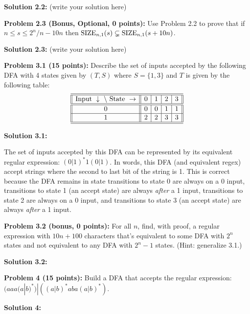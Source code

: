 \documentclass[11pt]{article}
\begin{document}
\textbf{Solution 2.2:} (write your solution here)

\textbf{Problem 2.3 (Bonus, Optional, 0 points):}
Use Problem 2.2 to prove that if $n \leq s \leq 2^n/n - 10n$ then $\mathrm{SIZE}_{n,1}(s) \subsetneq \mathrm{SIZE}_{n,1}(s+10n)$. 

\textbf{Solution 2.3:} (write your solution here)
\fi


\newpage 

\textbf{Problem 3.1 (15 points):} Describe the set of inputs accepted by the following DFA with 4 states given by $(T,S)$ where $S = \{1,3\}$ and $T$ is given by the following table:
\[
\begin{array}{||c||c|c|c|c||}
\hline
\hline
\mathrm{Input}~\downarrow ~\backslash~ \mathrm{State}~\to & 0 & 1 & 2 & 3 \\
\hline
\hline
0 & 0 & 0 & 1 & 1 \\
\hline
1 & 2 & 2 & 3 & 3 \\
\hline
\hline
\end{array}
\]

\textbf{Solution 3.1:}%

The set of inputs accepted by this DFA can be represented by its equivalent regular expression: $(0|1)^*1(0|1)$. In words, this DFA (and equivalent regex) accept strings where the second to last bit of the string is 1. This is correct because the DFA remains in state transitions to state 0 are always on a 0 input, transitions to state 1 (an accept state) are always \textit{after} a 1 input, transitions to state 2 are always on a 0 input, and transitions to state 3 (an accept state) are always \textit{after} a 1 input.
 
\textbf{Problem 3.2 (bonus, 0 points):} For all $n$, find, with proof, a regular expression with $10n + 100$ characters that's equivalent to some DFA with $2^n$ states and not equivalent to any DFA with $2^n - 1$ states. (Hint: generalize 3.1.)

\textbf{Solution 3.2:}%

\newpage

\textbf{Problem 4 (15 points):} Build a DFA that accepts the regular expression: $(aaa(a|b)^*)|\left((a|b)^*aba(a|b)^*\right)$.

\textbf{Solution 4:}%
\end{document}
